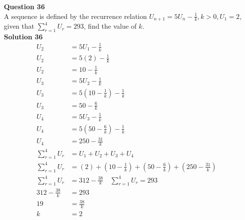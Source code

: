\documentclass{article}
\begin{document}
\noindent\textbf{Question 36}\\[5pt]
A sequence is defined by the recurrence relation $U_{n+1}=5U_n-\displaystyle\frac{1}{k},  k>0, U_1=2$, given that $\displaystyle\sum_{r=1}^{4} U_r=293$, find the value of $k$.\\[5pt]
\noindent\textbf{Solution 36}\\[5pt]
\begin{align*}
U_2&=5U_1-\displaystyle\frac{1}{k}\\[2pt]
U_2&=5(2)-\displaystyle\frac{1}{k}\\[2pt]
U_2&=10-\displaystyle\frac{1}{k}\\[12pt]
U_3&=5U_2-\displaystyle\frac{1}{k}\\[2pt]
U_3&=5\left(10-\displaystyle\frac{1}{k}\right)-\displaystyle\frac{1}{k}\\[2pt]
U_3&=50-\displaystyle\frac{6}{k}\\[12pt]
U_4&=5U_3-\displaystyle\frac{1}{k}\\[2pt]
U_4&=5\left(50-\displaystyle\frac{6}{k}\right)-\displaystyle\frac{1}{k}\\[2pt]
U_4&=250-\displaystyle\frac{31}{k}\\[12pt]
\displaystyle\sum_{r=1}^{4} U_r&=U_1+U_2+U_3+U_4\\[2pt]
\displaystyle\sum_{r=1}^{4} U_r&=(2)+\left(10-\displaystyle\frac{1}{k}\right)+\left(50-\displaystyle\frac{6}{k}\right)+\left(250-\displaystyle\frac{31}{k}\right)\\[2pt]
\displaystyle\sum_{r=1}^{4} U_r&=312-\displaystyle\frac{38}{k}\quad\displaystyle\sum_{r=1}^{4} U_r=293\\[2pt]
312-\displaystyle\frac{38}{k}&=293\\[2pt]
19&=\displaystyle\frac{38}{k}\\[2pt]
k&=2\\[-30pt]
\end{align*}\\[10pt]
\end{document}
